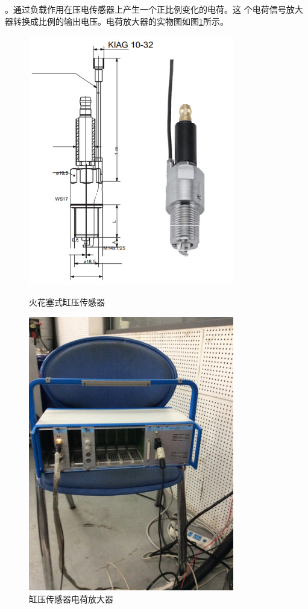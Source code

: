 。通过负载作用在压电传感器上产生一个正比例变化的电荷。这
个电荷信号放大器转换成比例的输出电压。电荷放大器的实物图如图\ref{fig:gycgqdhfdq}所示。
\begin{figure}[ht]
	\begin{minipage}[H]{0.5\linewidth}
		\includegraphics[width=0.8\textwidth]{thesis_figure/platformer_chapter/gycgq}
		\caption{火花塞式缸压传感器}
		\label{fig:gycgq}
	\end{minipage}
	\begin{minipage}[H]{0.5\linewidth}
		\includegraphics[width=0.8\textwidth]{thesis_figure/platformer_chapter/gycgqdhfdq}
		\caption{缸压传感器电荷放大器}
		\label{fig:gycgqdhfdq}
	\end{minipage}
\end{figure}
